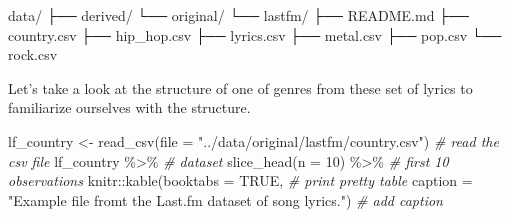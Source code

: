 \documentclass[
]{article}
\newenvironment{Shaded}{\begin{snugshade}}{\end{snugshade}}
\newcommand{\AttributeTok}[1]{\textcolor[rgb]{0.77,0.63,0.00}{#1}}
\newcommand{\CommentTok}[1]{\textcolor[rgb]{0.56,0.35,0.01}{\textit{#1}}}
\newcommand{\ConstantTok}[1]{\textcolor[rgb]{0.00,0.00,0.00}{#1}}
\newcommand{\DecValTok}[1]{\textcolor[rgb]{0.00,0.00,0.81}{#1}}
\newcommand{\ExtensionTok}[1]{#1}
\newcommand{\FunctionTok}[1]{\textcolor[rgb]{0.00,0.00,0.00}{#1}}
\newcommand{\NormalTok}[1]{#1}
\newcommand{\OtherTok}[1]{\textcolor[rgb]{0.56,0.35,0.01}{#1}}
\newcommand{\SpecialCharTok}[1]{\textcolor[rgb]{0.00,0.00,0.00}{#1}}
\newcommand{\StringTok}[1]{\textcolor[rgb]{0.31,0.60,0.02}{#1}}
\begin{document}
\begin{Shaded}
\begin{Highlighting}[]
\ExtensionTok{data/}
\ExtensionTok{├──}\NormalTok{ derived/}
\ExtensionTok{└──}\NormalTok{ original/}
    \ExtensionTok{└──}\NormalTok{ lastfm/}
        \ExtensionTok{├──}\NormalTok{ README.md}
        \ExtensionTok{├──}\NormalTok{ country.csv}
        \ExtensionTok{├──}\NormalTok{ hip\_hop.csv}
        \ExtensionTok{├──}\NormalTok{ lyrics.csv}
        \ExtensionTok{├──}\NormalTok{ metal.csv}
        \ExtensionTok{├──}\NormalTok{ pop.csv}
        \ExtensionTok{└──}\NormalTok{ rock.csv}
\end{Highlighting}
\end{Shaded}

Let's take a look at the structure of one of genres from these set of lyrics to familiarize ourselves with the structure.

\begin{Shaded}
\begin{Highlighting}[]
\NormalTok{lf\_country }\OtherTok{\textless{}{-}} \FunctionTok{read\_csv}\NormalTok{(}\AttributeTok{file =} \StringTok{"../data/original/lastfm/country.csv"}\NormalTok{) }\CommentTok{\# read the csv file}
\NormalTok{lf\_country }\SpecialCharTok{\%\textgreater{}\%} \CommentTok{\# dataset}
  \FunctionTok{slice\_head}\NormalTok{(}\AttributeTok{n =} \DecValTok{10}\NormalTok{) }\SpecialCharTok{\%\textgreater{}\%} \CommentTok{\# first 10 observations }
\NormalTok{knitr}\SpecialCharTok{::}\FunctionTok{kable}\NormalTok{(}\AttributeTok{booktabs =} \ConstantTok{TRUE}\NormalTok{, }\CommentTok{\# print pretty table}
             \AttributeTok{caption =} \StringTok{"Example file fromt the Last.fm dataset of song lyrics."}\NormalTok{) }\CommentTok{\# add caption}
\end{Highlighting}
\end{Shaded}
\end{document}
